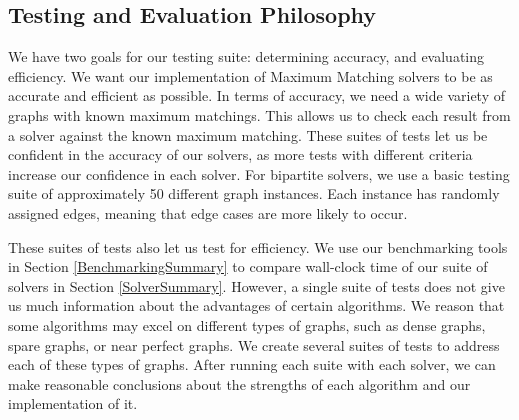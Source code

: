\subsection{Testing and Evaluation Philosophy}
We have two goals for our testing suite: determining accuracy, and evaluating
efficiency. We want our implementation of Maximum Matching solvers to be as 
accurate and efficient as possible. In terms of accuracy, we need a wide 
variety of graphs with known maximum matchings. This allows us to check each
result from a solver against the known maximum matching. These suites of tests
let us be confident in the accuracy of our solvers, as more tests with different
criteria increase our confidence in each solver. For bipartite solvers, we use 
a basic testing suite of approximately 50 different graph instances. Each instance 
has randomly assigned edges, meaning that edge cases are more likely to occur.

These suites of tests also let us test for efficiency. We use our benchmarking 
tools in Section \ref{BenchmarkingSummary} to compare wall-clock time of our suite
of solvers in Section \ref{SolverSummary}. However, a single suite of tests does 
not give us much information about the advantages of certain algorithms. We reason
that some algorithms may excel on different types of graphs, such as dense graphs, 
spare graphs, or near perfect graphs. We create several suites of tests to address
each of these types of graphs. After running each suite with each solver, we can 
make reasonable conclusions about the strengths of each algorithm and our 
implementation of it.